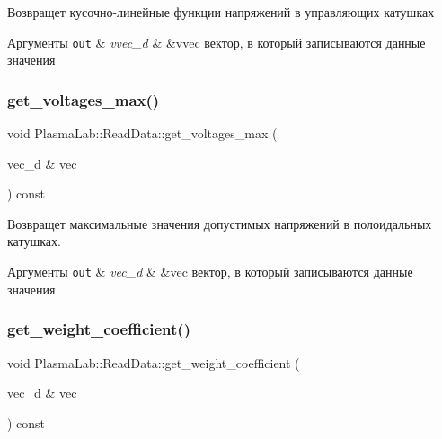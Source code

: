 Возвращет кусочно-\/линейные функции напряжений в управляющих катушках 
\begin{DoxyParams}[1]{Аргументы}
\mbox{\tt out}  & {\em vvec\+\_\+d} & \&vvec вектор, в который записываются данные значения \\
\hline
\end{DoxyParams}
\mbox{\label{class_plasma_lab_1_1_read_data_ab4ba9e63371b94deb343818e3356be8c}} 
\subsubsection{\texorpdfstring{get\+\_\+voltages\+\_\+max()}{get\_voltages\_max()}}
{\footnotesize\ttfamily void Plasma\+Lab\+::\+Read\+Data\+::get\+\_\+voltages\+\_\+max (\begin{DoxyParamCaption}\item[{vec\+\_\+d \&}]{vec }\end{DoxyParamCaption}) const\hspace{0.3cm}{\ttfamily [inline]}}

Возвращет максимальные значения допустимых напряжений в полоидальных катушках. 
\begin{DoxyParams}[1]{Аргументы}
\mbox{\tt out}  & {\em vec\+\_\+d} & \&vec вектор, в который записываются данные значения \\
\hline
\end{DoxyParams}
\mbox{\label{class_plasma_lab_1_1_read_data_adfa0d1b481e3000fd9ec4984b7d4100f}} 
\subsubsection{\texorpdfstring{get\+\_\+weight\+\_\+coefficient()}{get\_weight\_coefficient()}}
{\footnotesize\ttfamily void Plasma\+Lab\+::\+Read\+Data\+::get\+\_\+weight\+\_\+coefficient (\begin{DoxyParamCaption}\item[{vec\+\_\+d \&}]{vec }\end{DoxyParamCaption}) const\hspace{0.3cm}{\ttfamily [inline]}}

